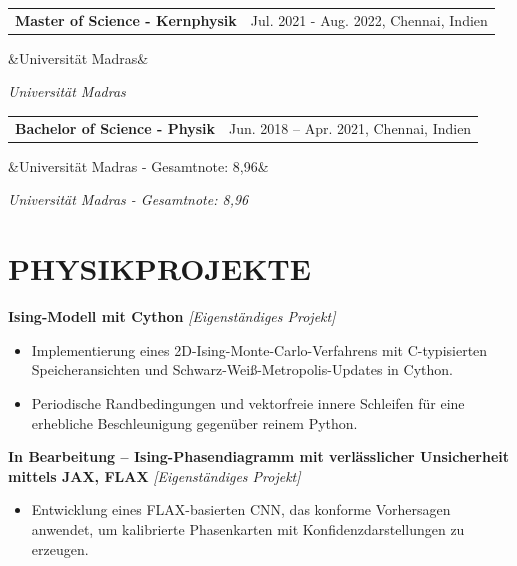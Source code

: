 \documentclass[11pt, a4paper]{article}
\makeatletter
\newcommand{\cventry}[3]{%
  \noindent
  \begin{tabularx}{\linewidth}{@{}X r@{}}
    \textbf{#1} & \small #3
  \end{tabularx}%
  \ifx&#2&\else\vspace{-\parskip}\vspace{0pt}\par\noindent\textit{#2}\fi
  \vspace{1pt}
}
\newcommand{\project}[2]{%
  \noindent\textbf{#1} \textit{[#2]}%
  \vspace{-1pt}
}
\newenvironment{cvlist}{%
  \begin{itemize}[leftmargin=1.2em, itemsep=-1pt, parsep=1pt, topsep=-1pt]
}{%
  \end{itemize}
}
\makeatother
\begin{document}
\vspace{0pt}

\cventry{Master of Science - Kernphysik}
        {Universität Madras}
        {Jul. 2021 - Aug. 2022, \hfill Chennai, Indien}

\vspace{0pt}

\cventry{Bachelor of Science - Physik}
        {Universität Madras - Gesamtnote: 8{,}96}
        {Jun. 2018 -- Apr. 2021, \hfill Chennai, Indien}

\vspace{7pt}

\section{PHYSIKPROJEKTE}

\project{Ising-Modell mit Cython}{Eigenständiges Projekt}
\begin{cvlist}
  \item Implementierung eines 2D-Ising-Monte-Carlo-Verfahrens mit C-typisierten
        Speicheransichten und Schwarz-Weiß-Metropolis-Updates in Cython.
  \item Periodische Randbedingungen und vektorfreie innere Schleifen für eine
        erhebliche Beschleunigung gegenüber reinem Python.
\end{cvlist}

\vspace{0pt}

\project{In Bearbeitung -- Ising-Phasendiagramm mit verlässlicher Unsicherheit mittels JAX, FLAX}{Eigenständiges Projekt}
\begin{cvlist}
  \item Entwicklung eines FLAX-basierten CNN, das konforme Vorhersagen anwendet,
        um kalibrierte Phasenkarten mit Konfidenzdarstellungen zu erzeugen.
\end{cvlist}

\vspace{0pt}
\end{document}
